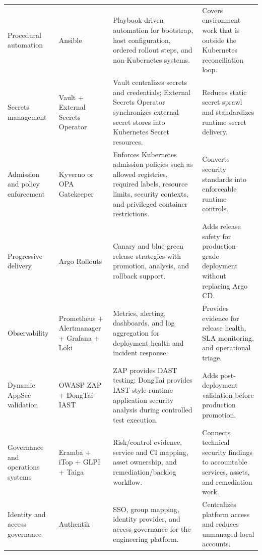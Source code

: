 \documentclass[10pt,letterpaper]{article}
\begin{document}
\begin{longtable}{L{2.5cm} L{3.2cm} L{5.9cm} L{4.0cm}}
Procedural automation & Ansible & Playbook-driven automation for bootstrap, host configuration, ordered rollout steps, and non-Kubernetes systems.\cite{AnsiblePlaybooks,AnsibleRolling} & Covers environment work that is outside the Kubernetes reconciliation loop. \\
Secrets management & Vault + External Secrets Operator & Vault centralizes secrets and credentials; External Secrets Operator synchronizes external secret stores into Kubernetes Secret resources.\cite{VaultDocs,ExternalSecretsDocs} & Reduces static secret sprawl and standardizes runtime secret delivery. \\
Admission and policy enforcement & Kyverno or OPA Gatekeeper & Enforces Kubernetes admission policies such as allowed registries, required labels, resource limits, security contexts, and privileged container restrictions.\cite{KyvernoDocs,GatekeeperDocs} & Converts security standards into enforceable runtime controls. \\
Progressive delivery & Argo Rollouts & Canary and blue-green release strategies with promotion, analysis, and rollback support.\cite{ArgoRolloutsDocs} & Adds release safety for production-grade deployment without replacing Argo CD. \\
Observability & Prometheus + Alertmanager + Grafana + Loki & Metrics, alerting, dashboards, and log aggregation for deployment health and incident response.\cite{PrometheusDocs,AlertmanagerDocs,GrafanaDocs,LokiDocs} & Provides evidence for release health, SLA monitoring, and operational triage. \\
Dynamic AppSec validation & OWASP ZAP + DongTai-IAST & ZAP provides DAST testing; DongTai provides IAST-style runtime application security analysis during controlled test execution.\cite{ZAPDocs,DongTaiDocs} & Adds post-deployment validation before production promotion. \\
Governance and operations systems & Eramba + iTop + GLPI + Taiga & Risk/control evidence, service and CI mapping, asset ownership, and remediation/backlog workflow.\cite{ErambaDocs,iTopDocs,GLPIDocs,TaigaDocs} & Connects technical security findings to accountable services, assets, and remediation work. \\
Identity and access governance & Authentik & SSO, group mapping, identity provider, and access governance for the engineering platform.\cite{AuthentikDocs} & Centralizes platform access and reduces unmanaged local accounts. \\
\end{longtable}
\normalsize
\end{document}
